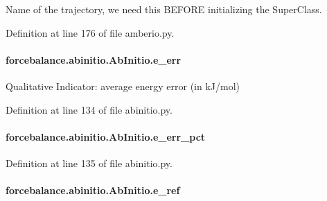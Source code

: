Name of the trajectory, we need this B\-E\-F\-O\-R\-E initializing the Super\-Class. 



Definition at line 176 of file amberio.\-py.

\hypertarget{classforcebalance_1_1abinitio_1_1AbInitio_aa569290969858e189935b3de37ead3f0}{
\paragraph[{e\-\_\-err}]{\setlength{\rightskip}{0pt plus 5cm}forcebalance.\-abinitio.\-Ab\-Initio.\-e\-\_\-err\hspace{0.3cm}{\ttfamily [inherited]}}}\label{classforcebalance_1_1abinitio_1_1AbInitio_aa569290969858e189935b3de37ead3f0}


Qualitative Indicator\-: average energy error (in k\-J/mol) 



Definition at line 134 of file abinitio.\-py.

\hypertarget{classforcebalance_1_1abinitio_1_1AbInitio_a4e3e525a03ab55bc004ebf0e3a0d60ce}{
\paragraph[{e\-\_\-err\-\_\-pct}]{\setlength{\rightskip}{0pt plus 5cm}forcebalance.\-abinitio.\-Ab\-Initio.\-e\-\_\-err\-\_\-pct\hspace{0.3cm}{\ttfamily [inherited]}}}\label{classforcebalance_1_1abinitio_1_1AbInitio_a4e3e525a03ab55bc004ebf0e3a0d60ce}


Definition at line 135 of file abinitio.\-py.

\hypertarget{classforcebalance_1_1abinitio_1_1AbInitio_a71d13d3fabd98146c68bb5fc784f6732}{
\paragraph[{e\-\_\-ref}]{\setlength{\rightskip}{0pt plus 5cm}forcebalance.\-abinitio.\-Ab\-Initio.\-e\-\_\-ref\hspace{0.3cm}{\ttfamily [inherited]}}}\label{classforcebalance_1_1abinitio_1_1AbInitio_a71d13d3fabd98146c68bb5fc784f6732}


